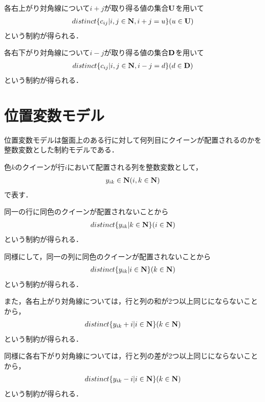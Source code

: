 各右上がり対角線について$i+j$が取り得る値の集合$\bf U$を用いて
\begin{eqnarray}
    distinct\{c_{ij} | i,j \in {\bf N}, i+j=u \} (u \in {\bf U}) \label{eq:bg_col_4}
\end{eqnarray}
という制約が得られる．

各右下がり対角線について$i-j$が取り得る値の集合$\bf D$を用いて
\begin{eqnarray}
    distinct\{c_{ij} | i,j \in {\bf N}, i-j=d \} (d \in {\bf D}) \label{eq:bg_col_5}
\end{eqnarray}
という制約が得られる．

\section{位置変数モデル}\label{sec:bg_pos}
位置変数モデルは盤面上のある行に対して何列目にクイーンが配置されるのかを整数変数とした制約モデルである．

色$k$のクイーンが行$i$において配置される列を整数変数として，
\begin{eqnarray}
    y_{ik} \in {\bf N} (i,k \in {\bf N}) \label{eq:bg_pos_1}
\end{eqnarray}
で表す．

同一の行に同色のクイーンが配置されないことから
\begin{eqnarray}
    distinct\{y_{ik} | k \in {\bf N} \} (i \in {\bf N}) \label{eq:bg_pos_2}
\end{eqnarray}
という制約が得られる．

同様にして，同一の列に同色のクイーンが配置されないことから
\begin{eqnarray}
    distinct\{y_{ik} | i \in {\bf N} \} (k \in {\bf N}) \label{eq:bg_pos_3}
\end{eqnarray}
という制約が得られる．

また，各右上がり対角線については，行と列の和が2つ以上同じにならないことから，
\begin{eqnarray}
    distinct\{y_{ik}+i | i \in {\bf N} \} (k \in {\bf N}) \label{eq:bg_pos_4}
\end{eqnarray}
という制約が得られる．

同様に各右下がり対角線については，行と列の差が2つ以上同じにならないことから，
\begin{eqnarray}
    distinct\{y_{ik}-i | i \in {\bf N} \} (k \in {\bf N}) \label{eq:bg_pos_5}
\end{eqnarray}
という制約が得られる．


